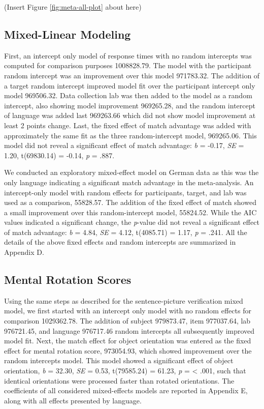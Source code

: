 \documentclass[
  man,floatsintext]{apa7}
\begin{document}
(Insert Figure \ref{fig:meta-all-plot} about here)

\hypertarget{mixed-linear-modeling}{%
\subsection{Mixed-Linear Modeling}\label{mixed-linear-modeling}}

First, an intercept only model of response times with no random
intercepts was computed for comparison purposes
1008828.79. The
model with the participant random intercept was an improvement over this
model 971783.32. The
addition of a target random intercept improved model fit over the
participant intercept only model
969506.32. Data
collection lab was then added to the model as a random intercept, also
showing model improvement
969265.28, and the
random intercept of language was added last
969263.66 which did
not show model improvement at least 2 points change. Last, the fixed
effect of match advantage was added with approximately the same fit as
the three random-intercept model,
969265.06. This model
did not reveal a significant effect of match advantage: \emph{b} =
-0.17, \emph{SE} =
1.20,
t(69830.14) =
-0.14, \emph{p} =
.887.

We conducted an exploratory mixed-effect model on German data as this
was the only language indicating a significant match advantage in the
meta-analysis. An intercept-only model with random effects for
participants, target, and lab was used as a comparison,
55828.57. The
addition of the fixed effect of match showed a small improvement over
this random-intercept model,
55824.52.
While the AIC values indicated a significant change, the \emph{p}-value did
not reveal a significant effect of match advantage: \emph{b} =
4.84, \emph{SE} =
4.12,
t(4085.71) =
1.17, \emph{p} =
.241. All the details of the above fixed
effects and random intercepts are summarized in Appendix D.

\hypertarget{mental-rotation-scores}{%
\subsection{Mental Rotation Scores}\label{mental-rotation-scores}}

Using the same steps as described for the sentence-picture verification
mixed model, we first started with an intercept only model with no
random effects for comparison
1029362.78. The
addition of subject
979873.47, item
977037.64, lab
976721.45, and language
976717.46 random
intercepts all subsequently improved model fit. Next, the match effect
for object orientation was entered as the fixed effect for mental
rotation score,
973054.93, which
showed improvement over the random intercepts model. This model showed a
significant effect of object orientation, \emph{b} =
32.30, \emph{SE} =
0.53,
t(79585.24) =
61.23, \emph{p} =
\textless{} .001, such that identical orientations were
processed faster than rotated orientations. The coefficients of all
considered mixed-effects models are reported in Appendix E, along with
all effects presented by language.
\end{document}
